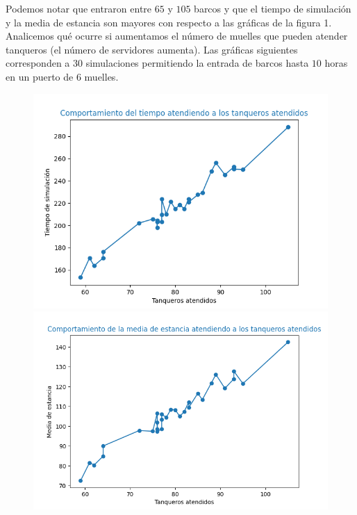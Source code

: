 \documentclass[twoside]{article}
\begin{document}
Podemos notar que entraron entre $65$ y $105$ barcos y que el tiempo de simulaci\'on y la media de estancia son mayores con respecto a las gr\'aficas de la figura 1.\\

Analicemos qu\'e ocurre si aumentamos el n\'umero de muelles que pueden atender tanqueros (el n\'umero de servidores aumenta). Las gr\'aficas siguientes corresponden a $30$ simulaciones permitiendo la entrada de barcos hasta $10$ horas en un puerto de $6$ muelles.\\


\begin{figure}[h]

\includegraphics[scale = 0.39]{img/Figure_5.png}
\includegraphics[scale=0.39]{img/Figure_6.png}
\caption{}

\end{figure} 
\end{document}
